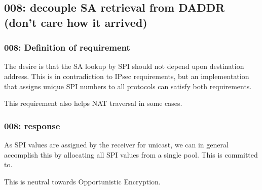 \subsection{008: decouple SA retrieval from DADDR (don't care how it arrived)}

\subsubsection{008: Definition of requirement }

The desire is that the SA lookup by SPI should not depend upon destination
address. This is in contradiction to IPsec requirements, but an
implementation that assigns unique SPI numbers to all protocols can satisfy
both requirements.

This requirement also helps NAT traversal in some cases.

\subsubsection{008: response}

As SPI values are assigned by the receiver for unicast, we can in general
accomplish this by allocating all SPI values from a single pool. This is
committed to.

This is neutral towards Opportunistic Encryption.


